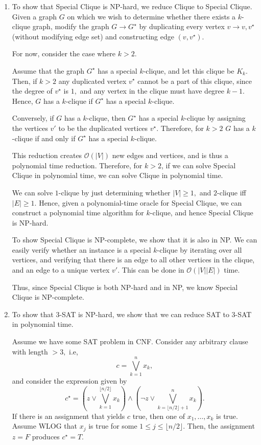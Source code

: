 \documentclass[12pt]{article}
\begin{document}
\begin{enumerate}
  \item To show that Special Clique is NP-hard, we reduce Clique to
    Special Clique. Given a graph $G$ on which we wish to determine
    whether there exists a $k$-clique graph, modify the graph $G \to
    G^\star$ by duplicating every vertex $v \to v, v^\star$ (without
    modifying edge set) and constructing edge $(v, v^\star).$

    For now, consider the case where $k > 2.$

    Assume that the graph $G^\star$ has a special $k$-clique, and let
    this clique be $K_k.$ Then, if $k > 2$ any duplicated vertex
    $v^\star$ cannot be a part of this clique, since the degree of
    $v^\star$ is $1,$ and any vertex in the clique must have degree
    $k - 1.$ Hence, $G$ has a $k$-clique if $G^\star$ has a special $k$-clique.

    Conversely, if $G$ has a $k$-clique, then $G^\star$ has a special
    $k$-clique by assigning the vertices $v'$ to be the duplicated
    vertices $v^\star.$ Therefore, for $k > 2$ $G$ has a $k$-clique
    if and only if $G^\star$ has a special $k$-clique.

    This reduction creates $\mathcal O(|V|)$ new edges and vertices,
    and is thus a polynomial time reduction. Therefore, for $k > 2$,
    if we can solve Special Clique in polynomial time, we can solve
    Clique in polynomial time.

    We can solve $1$-clique by just determining whether $|V| \geq 1,$
    and $2$-clique iff $|E| \geq 1.$ Hence, given a polynomial-time
    oracle for Special Clique, we can construct a polynomial time
    algorithm for $k$-clique, and hence Special Clique is NP-hard.

    To show Special Clique is NP-complete, we show that it is also in
    NP. We can easily verify whether an instance is a special
    $k$-clique by iterating over all vertices, and verifying that
    there is an edge to all other vertices in the clique, and an edge
    to a unique vertex $v'.$ This can be done in $\mathcal O(|V||E|)$ time.

    Thus, since Special Clique is both NP-hard and in NP, we know
    Special Clique is NP-complete.

  \item To show that 3-SAT is NP-hard, we show that we can reduce SAT
    to 3-SAT in polynomial time.

    Assume we have some SAT problem in CNF. Consider any arbitrary
    clause with length $> 3,$ i.e,
    $$
    c = \bigvee_{k = 1}^{n} x_k,
    $$
    and consider the expression given by
    $$
    c^\star = \left(z \lor \bigvee_{k = 1}^{\lfloor n/2 \rfloor} x_k
    \right) \land \left(\neg z \lor \bigvee_{k = \lfloor n/2 \rfloor
    + 1}^{n} x_k \right).
    $$
    If there is an assignment that yields $c$ true, then one of $x_1,
    \ldots, x_k$ is true. Assume WLOG that $x_j$ is true for some $1
    \leq j \leq \lfloor n / 2 \rfloor.$ Then, the assignment $z = F$
    produces $c^\star = T.$


\end{enumerate}
\end{document}
